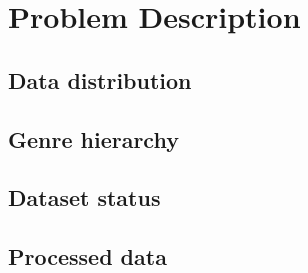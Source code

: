 
\chapter{Problem Description}

\label{problem description}


\section{Data distribution}


\section{Genre hierarchy}


\section{Dataset status}


\section{Processed data}


